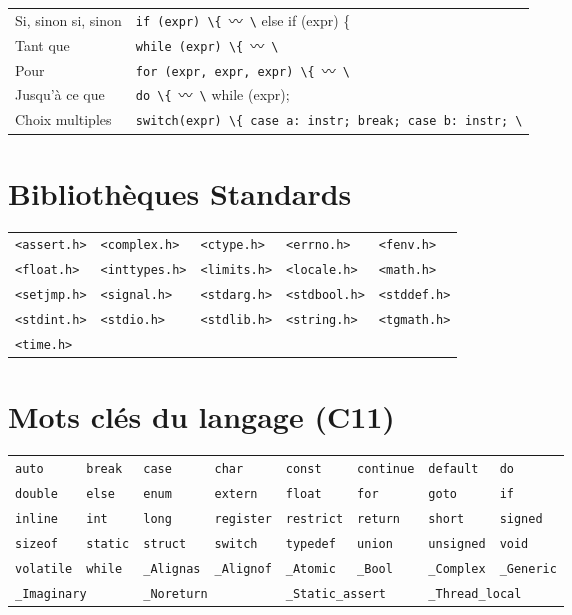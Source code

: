 \documentclass{article}
\newcommand{\any}{$\hzigzag$~}
\newcommand{\cd}{\lstinline}
\begin{document}
\begin{multicols*}{3}
  \begin{tabularx}{\linewidth}{Xl}
  Si, sinon si, sinon & \cd{if (expr) \{}~\any\cd{\} else if (expr) \{}~\any\cd{\} else \{}~\any\cd{\};} \\
  Tant que & \cd{while (expr) \{}~\any\cd{\}} \\
  Pour & \cd{for (expr, expr, expr) \{}~\any\cd{\}} \\
  Jusqu'à ce que & \cd{do \{}~\any\cd{\} while (expr);} \\
  Choix multiples & \cd{switch(expr) \{ case a: instr; break; case b: instr; \}} \\
  \end{tabularx}

\section*{Bibliothèques Standards}
  \begin{tabularx}{\linewidth}{XXXXX}
    \cd{<assert.h>} & \cd{<complex.h>}  & \cd{<ctype.h>}  & \cd{<errno.h>}   & \cd{<fenv.h>} \\
    \cd{<float.h>}  & \cd{<inttypes.h>} & \cd{<limits.h>} & \cd{<locale.h>}  & \cd{<math.h>} \\
    \cd{<setjmp.h>} & \cd{<signal.h>}   & \cd{<stdarg.h>} & \cd{<stdbool.h>} & \cd{<stddef.h>} \\
    \cd{<stdint.h>} & \cd{<stdio.h>}    & \cd{<stdlib.h>} & \cd{<string.h>}  & \cd{<tgmath.h>} \\
    \cd{<time.h>}   &              &            &             & \\
  \end{tabularx}

\section*{Mots clés du langage (C11)}
  \begin{tabularx}{\linewidth}{XXXXXXXX}
    \cd{auto} &
    \cd{break} &
    \cd{case} &
    \cd{char} &
    \cd{const} &
    \cd{continue} &
    \cd{default} &
    \cd{do} \\
    \cd{double} &
    \cd{else} &
    \cd{enum} &
    \cd{extern} &
    \cd{float} &
    \cd{for} &
    \cd{goto} &
    \cd{if} \\
    \cd{inline} &
    \cd{int} &
    \cd{long} &
    \cd{register} &
    \cd{restrict} &
    \cd{return} &
    \cd{short} &
    \cd{signed} \\
    \cd{sizeof} &
    \cd{static} &
    \cd{struct} &
    \cd{switch} &
    \cd{typedef} &
    \cd{union} &
    \cd{unsigned} &
    \cd{void} \\
    \cd{volatile} &
    \cd{while} &
    \cd{_Alignas} &
    \cd{_Alignof} &
    \cd{_Atomic} &
    \cd{_Bool} &
    \cd{_Complex} &
    \cd{_Generic} \\
    \multicolumn{2}{l}{\cd{_Imaginary}} &
    \multicolumn{2}{l}{\cd{_Noreturn}} &
    \multicolumn{2}{l}{\cd{_Static_assert}} &
    \multicolumn{2}{l}{\cd{_Thread_local}}
  \end{tabularx}

\end{multicols*}
\end{document}
